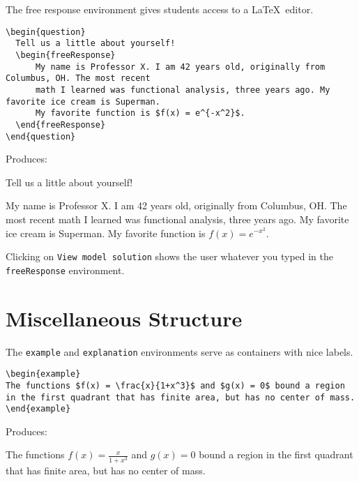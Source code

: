 \documentclass{ximera}
\begin{document}
\begin{example}The free response environment gives students access to a \LaTeX\ editor. 

\begin{verbatim}
\begin{question}
  Tell us a little about yourself!
  \begin{freeResponse}
      My name is Professor X. I am 42 years old, originally from Columbus, OH. The most recent 
      math I learned was functional analysis, three years ago. My favorite ice cream is Superman. 
      My favorite function is $f(x) = e^{-x^2}$.
  \end{freeResponse}
\end{question}
\end{verbatim}

Produces:

\begin{question}
  Tell us a little about yourself!
  \begin{freeResponse}
      My name is Professor X. I am 42 years old, originally from Columbus, OH. The most recent 
      math I learned was functional analysis, three years ago. My favorite ice cream is Superman. 
      My favorite function is $f(x) = e^{-x^2}.$
  \end{freeResponse}
\end{question}

\begin{remark}
Clicking on \verb!View model solution! shows the user
whatever you typed in the  \verb!freeResponse! environment.
\end{remark}
\end{example}

\section{Miscellaneous Structure} \label{StructuralEnvironments}

\begin{example}
The \verb!example! and \verb!explanation! environments serve as containers with nice labels. 

\begin{verbatim}
\begin{example}
The functions $f(x) = \frac{x}{1+x^3}$ and $g(x) = 0$ bound a region in the first quadrant that has finite area, but has no center of mass. 
\end{example}
\end{verbatim}

Produces:
\begin{example}
The functions $f(x) = \frac{x}{1+x^3}$ and $g(x) = 0$ bound a region in the first quadrant that has finite area, but has no center of mass. 
\end{example}
\end{example}
\end{document}

